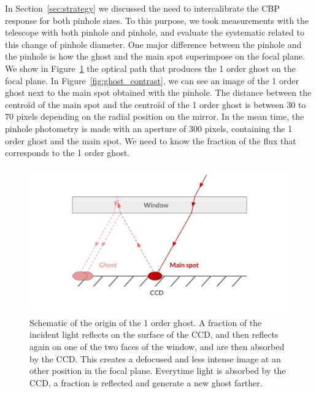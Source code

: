 In Section~\ref{sec:strategy} we discussed the need to intercalibrate the CBP response for both pinhole sizes. To this purpose, we took measurements with the \SD telescope with both \bpinhole pinhole and \spinhole pinhole, and evaluate the systematic related to this change of pinhole diameter. One major difference between the \spinhole pinhole and the \bpinhole pinhole is how the ghost and the main spot superimpose on the focal plane. We show in Figure~\ref{fig:schema_ghost} the optical path that produces the 1 order ghost on the focal plane. In Figure~\ref{fig:ghost_contrast}, we can see an image of the 1 order ghost next to the main spot obtained with the \spinhole pinhole. The distance between the centroïd of the main spot and the centroïd of the 1 order ghost is between 30 to 70 pixels depending on the radial position on the mirror. In the mean time, the \bpinhole pinhole photometry is made with an aperture of 300 pixels, containing the 1 order ghost and the main spot. We need to know the fraction of the flux that corresponds to the 1 order ghost.


\begin{figure}[h]
    \centering
    \includegraphics[width=\columnwidth]{fig/schema_ghost.pdf}
    \caption{Schematic of the origin of the 1 order ghost. A fraction of the incident light reflects on the surface of the CCD, and then reflects again on one of the two faces of the window, and are then absorbed by the CCD. This creates a defocused and less intense image at an other position in the focal plane. Everytime light is absorbed by the CCD, a fraction is reflected and generate a new ghost farther.}
    \label{fig:schema_ghost}
\end{figure}


